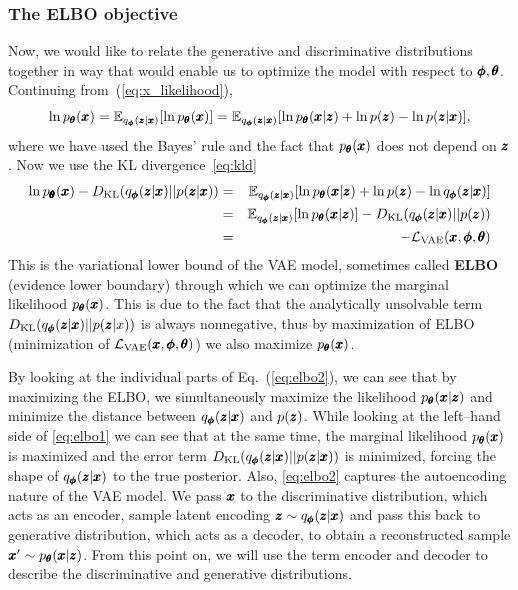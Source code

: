 \subsubsection{The ELBO objective}
Now, we would like to relate the generative and discriminative distributions together in way that would enable us to optimize the model with respect to $\pmb{{\phi}},\pmb{{\theta}}$. Continuing from~(\ref{eq:x_likelihood}),
\begin{equation}
\ln p_{\vc{\theta}}(\vc{x})=\mathbb{E}_{q_{\vc{\phi}}(\vc{z}|\vc{x})}\left[\ln p_{\vc{\theta}}(\vc{x})\right]=\mathbb{E}_{q_{\vc{\phi}}(\vc{z}|\vc{x})}\left[\ln p_{\vc{\theta}}(\vc{x}|\vc{z})+\ln p(\vc{z})-\ln p(\vc{z}|\vc{x})\right],
\end{equation}
where we have used the Bayes' rule and the fact that $p_{\pmb{{\theta}}}(\pmb{{x}})$ does not depend on $\pmb{{z}}$. Now we use the KL divergence~\eqref{eq:kld}
\begin{eqnarray}
\ln p_{\vc{\vc{\theta}}}(\vc{x})-D_{\text{KL}}\left(q_{\vc{\phi}}(\vc{z}|\vc{x})||p(\vc{z}|\vc{x})\right) & = & \mathbb{E}_{q_{\vc{\phi}}(\vc{z}|\vc{x})}\left[\ln p_{\vc{\theta}}(\vc{x}|\vc{z})+\ln p(\vc{z})-\ln q_{\vc{\phi}}(\vc{z}|\vc{x})\right]\label{eq:elbo1}\\
 & = & \mathbb{E}_{q_{\vc{\phi}}(\vc{z}|\vc{x})}\left[\ln p_{\vc{\theta}}(\vc{x}|\vc{z})\right]-D_{\text{KL}}\left(q_{\vc{\phi}}(\vc{z}|\vc{x})||p(\vc{z})\right)\label{eq:elbo2}\\
 & = & - \mathcal{L}_{\text{VAE}}(\vc{x},\vc{\phi},\vc{\theta})\label{eq:elbo3}
\end{eqnarray}
This is the variational lower bound of the VAE model, sometimes called \textbf{ELBO} (evidence lower boundary) through which we can optimize the marginal likelihood $p_{\pmb{{\theta}}}(\pmb{{x}})$. This is due to the fact that the analytically unsolvable term $D_{\text{KL}}\left(q_{\vc{\phi}}(\vc{z}|\vc{x})||p(\vc{z}|x)\right)$ is always nonnegative, thus by maximization of ELBO (minimization of $\mathcal{L}_{\text{VAE}}(\pmb{{x}},\pmb{{\phi}},\pmb{{\theta}})$) we also maximize $p_{\pmb{{\theta}}}(\pmb{{x}})$.

By looking at the individual parts of Eq.~(\ref{eq:elbo2}), we can see that by maximizing the ELBO, we simultaneously maximize the likelihood $p_{\pmb{{\theta}}}(\pmb{{x}}|\pmb{{z}})$ and minimize the distance between $q_{\pmb{{\phi}}}(\pmb{{z}}|\pmb{{x}})$ and $p(\pmb{{z}})$. While looking at the left--hand side of \eqref{eq:elbo1} we can see that at the same time, the marginal likelihood $p_{\pmb{{\theta}}}(\pmb{{x}})$ is maximized and the error term $D_{\text{KL}}\left(q_{\vc{\phi}}(\vc{z}|\vc{x})||p(\vc{z}|\vc{x})\right)$ is minimized, forcing the shape of $q_{\pmb{{\phi}}}(\pmb{{z}}|\pmb{{x}})$ to the true posterior. Also, \eqref{eq:elbo2} captures the autoencoding nature of the VAE model. We pass $\pmb{{x}}$ to the discriminative distribution, which acts as an encoder, sample latent encoding $\pmb{{z}} \sim q_{\pmb{{\phi}}}(\pmb{{z}}|\pmb{{x}})$ and pass this back to generative distribution, which acts as a decoder, to obtain a reconstructed sample $\pmb{{x}}' \sim p_{\pmb{{\theta}}}(\pmb{{x}}|\pmb{{z}})$. From this point on, we will use the term encoder and decoder to describe the discriminative and generative distributions.


